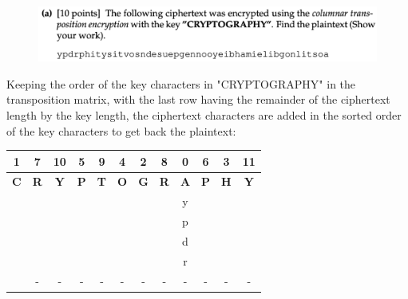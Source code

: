 \documentclass{ashoka-crypto}
\begin{document}
\begin{figure}[h]
\includegraphics[width=17cm]{3a}
\end{figure}

Keeping the order of the key characters in "CRYPTOGRAPHY" in the transposition matrix, with the last row having the remainder of the ciphertext length by the key length, the ciphertext characters are added in the sorted order of the key characters to get back the plaintext:

\begin{center}
\begin{tabular}{|c|c|c|c|c|c|c|c|c|c|c|c|}
\hline
1          & 7          & 10         & 5          & 9          & 4          & 2          & 8          & 0          & 6          & 3          & 11         \\ \hline
\textbf{C} & \textbf{R} & \textbf{Y} & \textbf{P} & \textbf{T} & \textbf{O} & \textbf{G} & \textbf{R} & \textbf{A} & \textbf{P} & \textbf{H} & \textbf{Y} \\ \hline
           &            &            &            &            &            &            &            & y          &            &            &            \\ \hline
           &            &            &            &            &            &            &            & p          &            &            &            \\ \hline
           &            &            &            &            &            &            &            & d          &            &            &            \\ \hline
           &            &            &            &            &            &            &            & r          &            &            &            \\ \hline
           &     -       &    -        &      -     &     -       &      -      &     -       &     -       &      -      &     -       &       -     &  -            \\ \hline
\end{tabular}
\end{center}
\end{document}
